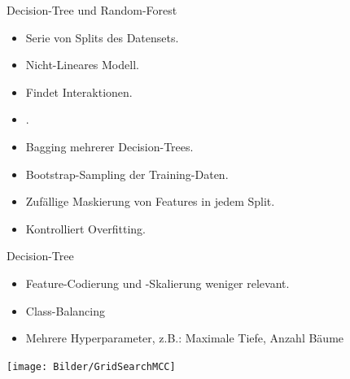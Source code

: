 \begin{frame}{Decision-Tree und Random-Forest}
{
\begin{itemize}
\item Serie von Splits des Datensets.
\item Nicht-Lineares Modell.
\item Findet Interaktionen.
\item {}.
\end{itemize}
}
{
\begin{itemize}
\item Bagging mehrerer Decision-Trees.
\item Bootstrap-Sampling der Training-Daten.
\item Zufällige Maskierung von Features in jedem Split.
\item Kontrolliert Overfitting.
\end{itemize}
}
\end{frame}

\begin{frame}{Decision-Tree}
{
\begin{itemize}
\item Feature-Codierung und -Skalierung weniger relevant.
\item Class-Balancing
\item Mehrere Hyperparameter, z.B.: Maximale Tiefe, Anzahl Bäume
\end{itemize}
}
\centering
\texttt{[image: Bilder/GridSearchMCC]} 
\end{frame}

